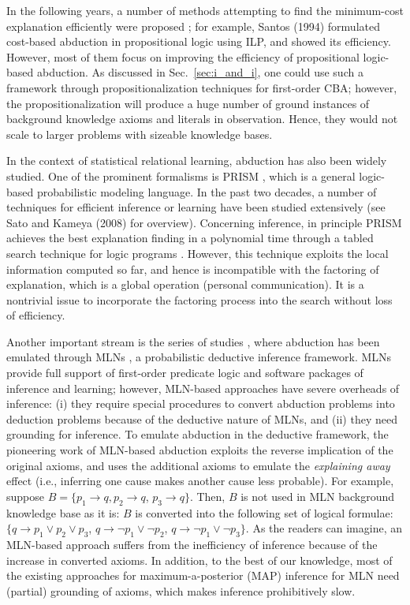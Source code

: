\documentclass[english]{jnlp_1.4}
\begin{document}
In the following years, a number of
methods attempting to find the minimum-cost explanation efficiently were
 proposed
\cite{Santos94,Ishizuka98,Prendinger99,Abdelbar05,Chivers07,Guinn08};
for example, Santos (1994) formulated cost-based abduction in
propositional logic using ILP, and showed its efficiency. However,
most of them focus on improving the efficiency of propositional
logic-based abduction. As discussed in Sec.~\ref{sec:i_and_i}, one
could use such a framework through propositionalization techniques for
first-order CBA; however, the propositionalization will produce a huge
number of ground instances of background knowledge axioms and literals
in observation. Hence, they would not scale to larger problems with
sizeable knowledge bases.


In the context of statistical relational learning, abduction has also
been widely studied. One of the prominent formalisms is PRISM
\cite{Sato08}, which is a general logic-based probabilistic modeling
language. In the past two decades, a number of techniques for
efficient inference or learning have been studied extensively (see Sato
and Kameya (2008)\nocite{Sato08} for overview). Concerning inference,
in principle PRISM achieves the best explanation finding in a
polynomial time through a tabled search technique for logic programs
\cite{Tamaki86}. However, this technique exploits the local
information computed so far, and hence is incompatible with
the factoring of explanation, which is a global operation
(personal communication). It is a nontrivial issue to incorporate the
factoring process into the search without loss of efficiency.


Another important stream is the series of studies
\cite{Kate09,Blythe11,Singla11}, where abduction has been
emulated through MLNs \cite{Richardson06}, a
probabilistic deductive inference framework. MLNs provide full support
of first-order predicate logic and software packages of inference
and learning; however, MLN-based approaches have severe overheads of
inference: (i) they require special procedures to convert abduction
problems into deduction problems because of the deductive nature of
MLNs, and (ii) they need grounding for inference.
To emulate abduction in the deductive framework, the pioneering work
of MLN-based abduction \cite{Kate09} exploits the reverse implication
of the original axioms, and uses the additional axioms to emulate
the \emph{explaining away} effect (i.e., inferring one cause makes another
cause less probable). For example, suppose {\small $B = \{p_1
  \rightarrow q, p_2 \rightarrow q$, $ p_3 \rightarrow q\}$}. Then,
$B$ is not used in MLN background knowledge base as it is: $B$ is
converted into the following set of logical formulae: {\small $\{q
  \rightarrow p_1 \lor p_2 \lor p_3$, $q \rightarrow \lnot p_1 \lor
  \lnot p_2$, $q \rightarrow \lnot p_1 \lor \lnot p_3\}$}. As the
readers can imagine, an MLN-based approach suffers from the inefficiency
of inference because of the increase in converted axioms. In addition, to
the best of our knowledge, most of the existing approaches for
maximum-a-posterior (MAP) inference for MLN
\cite[etc.]{Singla06,Riedel08} need (partial) grounding of axioms,
which makes inference prohibitively
slow.
\end{document}

